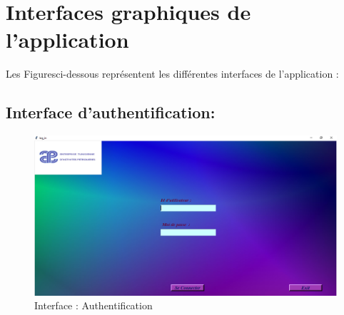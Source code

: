 \documentclass[12pt]{report}
\begin{document}
\section{Interfaces graphiques de l'application}
Les Figuresci-dessous représentent les différentes interfaces de l'application :

\subsection{Interface d'authentification:}

\begin{figure}[H]
  \centering
  \includegraphics[scale=0.47]{login}
  \caption{Interface : Authentification}
  \label{fig:votre-label}
\end{figure}
\newpage
\end{document}
